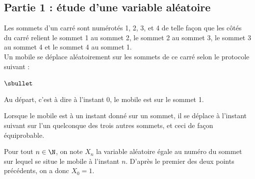 \subsection*{Partie 1 : étude d'une variable aléatoire}

\noindent
Les sommets d'un carré sont numérotés 1, 2, 3, et 4 de telle façon que
les côtés du carré relient le sommet 1 au sommet 2, le sommet 2 au
sommet 3, le sommet 3 au sommet 4 et le sommet 4 au sommet 1.\\
Un mobile se déplace aléatoirement sur les sommets de ce carré selon
le protocole suivant :
\begin{noliste}{$\sbullet$}
\item Au départ, c'est à dire à l'instant $0$, le mobile est sur le
  sommet 1.
\item Lorsque le mobile est à un instant donné sur un sommet, il se
  déplace à l'instant suivant sur l'un quelconque des trois autres
  sommets, et ceci de façon équiprobable.
\end{noliste}
Pour tout $n \in \N$, on note $X_{n}$ la variable aléatoire égale au
numéro du sommet sur lequel se situe le mobile à l'instant
$n$. D'après le premier des deux points précédents, on a donc $X_{0} =
1$.
